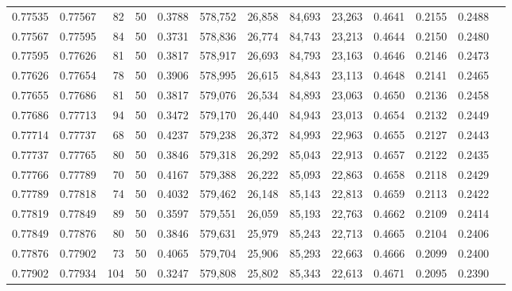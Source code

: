\begin{tabular}{rrrrrrrrrrrrr}
0.77535 & 0.77567 &    82 &  50 &                                     0.3788 & 578,752 &  26,858 &  84,693 &  23,263 & 0.4641 & 0.2155 & 0.2488 \\
0.77567 & 0.77595 &    84 &  50 &                                     0.3731 & 578,836 &  26,774 &  84,743 &  23,213 & 0.4644 & 0.2150 & 0.2480 \\
0.77595 & 0.77626 &    81 &  50 &                                     0.3817 & 578,917 &  26,693 &  84,793 &  23,163 & 0.4646 & 0.2146 & 0.2473 \\
0.77626 & 0.77654 &    78 &  50 &                                     0.3906 & 578,995 &  26,615 &  84,843 &  23,113 & 0.4648 & 0.2141 & 0.2465 \\
0.77655 & 0.77686 &    81 &  50 &                                     0.3817 & 579,076 &  26,534 &  84,893 &  23,063 & 0.4650 & 0.2136 & 0.2458 \\
0.77686 & 0.77713 &    94 &  50 &                                     0.3472 & 579,170 &  26,440 &  84,943 &  23,013 & 0.4654 & 0.2132 & 0.2449 \\
0.77714 & 0.77737 &    68 &  50 &                                     0.4237 & 579,238 &  26,372 &  84,993 &  22,963 & 0.4655 & 0.2127 & 0.2443 \\
0.77737 & 0.77765 &    80 &  50 &                                     0.3846 & 579,318 &  26,292 &  85,043 &  22,913 & 0.4657 & 0.2122 & 0.2435 \\
0.77766 & 0.77789 &    70 &  50 &                                     0.4167 & 579,388 &  26,222 &  85,093 &  22,863 & 0.4658 & 0.2118 & 0.2429 \\
0.77789 & 0.77818 &    74 &  50 &                                     0.4032 & 579,462 &  26,148 &  85,143 &  22,813 & 0.4659 & 0.2113 & 0.2422 \\
0.77819 & 0.77849 &    89 &  50 &                                     0.3597 & 579,551 &  26,059 &  85,193 &  22,763 & 0.4662 & 0.2109 & 0.2414 \\
0.77849 & 0.77876 &    80 &  50 &                                     0.3846 & 579,631 &  25,979 &  85,243 &  22,713 & 0.4665 & 0.2104 & 0.2406 \\
0.77876 & 0.77902 &    73 &  50 &                                     0.4065 & 579,704 &  25,906 &  85,293 &  22,663 & 0.4666 & 0.2099 & 0.2400 \\
0.77902 & 0.77934 &   104 &  50 &                                     0.3247 & 579,808 &  25,802 &  85,343 &  22,613 & 0.4671 & 0.2095 & 0.2390 \\

\end{tabular}
